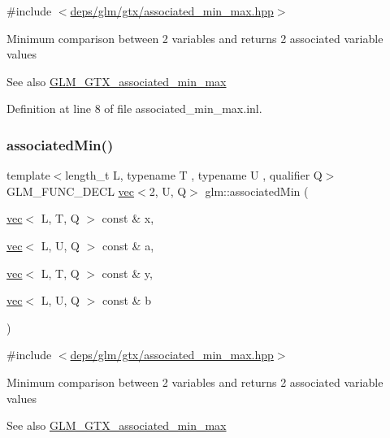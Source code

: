 {\ttfamily \#include $<$\hyperlink{associated__min__max_8hpp}{deps/glm/gtx/associated\+\_\+min\+\_\+max.\+hpp}$>$}

Minimum comparison between 2 variables and returns 2 associated variable values \begin{DoxySeeAlso}{See also}
\hyperlink{group__gtx__associated__min__max}{G\+L\+M\+\_\+\+G\+T\+X\+\_\+associated\+\_\+min\+\_\+max} 
\end{DoxySeeAlso}


Definition at line 8 of file associated\+\_\+min\+\_\+max.\+inl.

\mbox{\label{group__gtx__associated__min__max_gac2f0dff90948f2e44386a5eafd941d1c}} 
\subsubsection{\texorpdfstring{associated\+Min()}{associatedMin()}\hspace{0.1cm}{\footnotesize\ttfamily [2/10]}}
{\footnotesize\ttfamily template$<$length\+\_\+t L, typename T , typename U , qualifier Q$>$ \\
G\+L\+M\+\_\+\+F\+U\+N\+C\+\_\+\+D\+E\+CL \hyperlink{structglm_1_1vec}{vec}$<$2, U, Q$>$ glm\+::associated\+Min (\begin{DoxyParamCaption}\item[{\hyperlink{structglm_1_1vec}{vec}$<$ L, T, Q $>$ const \&}]{x,  }\item[{\hyperlink{structglm_1_1vec}{vec}$<$ L, U, Q $>$ const \&}]{a,  }\item[{\hyperlink{structglm_1_1vec}{vec}$<$ L, T, Q $>$ const \&}]{y,  }\item[{\hyperlink{structglm_1_1vec}{vec}$<$ L, U, Q $>$ const \&}]{b }\end{DoxyParamCaption})}



{\ttfamily \#include $<$\hyperlink{associated__min__max_8hpp}{deps/glm/gtx/associated\+\_\+min\+\_\+max.\+hpp}$>$}

Minimum comparison between 2 variables and returns 2 associated variable values \begin{DoxySeeAlso}{See also}
\hyperlink{group__gtx__associated__min__max}{G\+L\+M\+\_\+\+G\+T\+X\+\_\+associated\+\_\+min\+\_\+max} 
\end{DoxySeeAlso}


